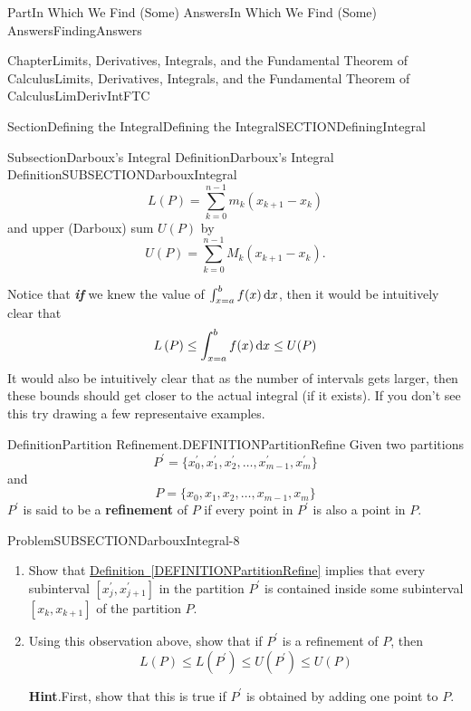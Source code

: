 \documentclass[oneside,10pt,]{book}
\newcommand{\blocktitlefont}{\relax}
\newcommand{\xreffont}{\relax}
\newcommand{\alert}[1]{\textbf{\textit{#1}}}
\newcommand{\terminology}[1]{\textbf{#1}}
\numberwithin{equation}{part}
\newcommand{\dx}[1]{\,{\rm d}#1}
\begin{document}
\begin{partptx}{Part}{In Which We Find (Some) Answers}{}{In Which We Find (Some) Answers}{}{}{FindingAnswers}
\begin{chapterptx}{Chapter}{Limits, Derivatives, Integrals, and the Fundamental Theorem of Calculus}{}{Limits, Derivatives, Integrals, and the Fundamental Theorem of Calculus}{}{}{LimDerivIntFTC}
\begin{sectionptx}{Section}{Defining the Integral}{}{Defining the Integral}{}{}{SECTIONDefiningIntegral}
\begin{subsectionptx}{Subsection}{Darboux's Integral Definition}{}{Darboux's Integral Definition}{}{}{SUBSECTIONDarbouxIntegral}
\begin{equation*}
L\left(P\right)=\sum^{n-1}_{k=0}{m_k\left(x_{k+1}-x_k\right)}
\end{equation*}
and upper (Darboux) sum \(U(P)\) by%
\begin{equation*}
U\left(P\right)=\sum^{n-1}_{k=0}{M_k\left(x_{k+1}-x_k\right)}\text{.}
\end{equation*}
%
\par
Notice that \alert{if} we knew  the  value of \(\int^b_{x=a}{f(x)\dx{x}}\), then it would be intuitively clear that%
\begin{equation*}
L\left(P\right)\le \int^b_{x=a}{f(x)\dx{x}}\le
U(P)
\end{equation*}
It would also be intuitively clear that as the number of intervals gets larger, then these bounds should get closer to the actual integral (if it exists). If you don't see this try drawing a few representaive examples.%
\begin{definition}{Definition}{Partition Refinement.}{DEFINITIONPartitionRefine}%
Given two partitions%
\begin{equation*}
P^\prime=\{x^\prime_0, x^\prime_1,
x^\prime_2, \dots , x^\prime_{m-1},x^\prime_m\} 
\end{equation*}
and%
\begin{equation*}
P=\{x_0, x_1, x_2, \dots , x_{m-1},x_m\} 
\end{equation*}
\(P^\prime \) is said to be  a \terminology{refinement} of \(P\) if every  point in  \(P^\prime\) is also a point in \(P\).%
\end{definition}
\begin{problem}{Problem}{}{SUBSECTIONDarbouxIntegral-8}%
\begin{enumerate}[font=\bfseries,label=(\alph*),ref=\alph*]%
\item{}Show that \hyperref[DEFINITIONPartitionRefine]{Definition~{\xreffont\ref{DEFINITIONPartitionRefine}}} implies   that every subinterval \([x^\prime_j,x^\prime_{j+1}]\) in the partition \(P^\prime\) is contained inside some subinterval \([x_k,
x_{k+1}]\) of the partition \(P\).%
\item{}Using this observation above, show that if \(P^\prime\) is a refinement of \(P\), then%
\begin{equation*}
L\left(P\right)\le L\left(P^\prime\right)\le
U\left(P^\prime\right)\le U(P)
\end{equation*}
%
\par\smallskip%
\noindent\textbf{\blocktitlefont Hint}.\hypertarget{SUBSECTIONDarbouxIntegral-8-2-2}{}\quad{}First, show that this is true if \(P^\prime\) is obtained by adding one point to \(P\).%

\end{enumerate}
\end{problem}
\end{subsectionptx}
\end{sectionptx}
\end{chapterptx}
\end{partptx}
\end{document}
